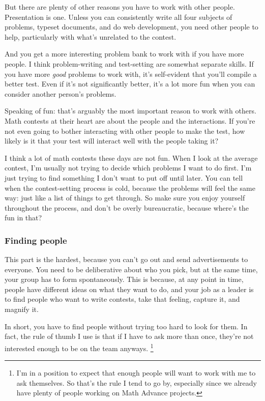 \documentclass[points=false]{bounce}
\begin{document}
But there are plenty of other reasons you have to work with other people.
Presentation is one. Unless you can consistently write all four subjects of problems,
typeset documents, and do web development, you need other people to help, particularly with
what's unrelated to the contest.

And you get a more interesting problem bank to work with if you have more people.
I think problem-writing and test-setting are somewhat separate skills.
If you have more \emph{good} problems to work with, it's self-evident
that you'll compile a better test. Even if it's not significantly better,
it's a lot more fun when you can consider another person's problems.

Speaking of fun: that's arguably the most important reason to work with others.
Math contests at their heart are about the people and the interactions.
If you're not even going to bother interacting with other people to make the test,
how likely is it that your test will interact well with the people taking it?

I think a lot of math contests these days are not fun.
When I look at the average contest,
I'm usually not trying to decide which problems I want to do first.
I'm just trying to find something I don't want to put off until later.
You can tell when the contest-setting process is cold,
because the problems will feel the same way:
just like a list of things to get through.
So make sure you enjoy yourself throughout the process,
and don't be overly bureaucratic, because where's the fun in that?

\subsubsection{Finding people}

This part is the hardest, because you can't go out and send advertisements to everyone.
You need to be deliberative about who you pick, but at the same time,
your group has to form spontaneously.
This is because, at any point in time, people have different ideas on what they want to do,
and your job as a leader is to find people who want to write contests,
take that feeling, capture it, and magnify it.

In short, you have to find people without
trying too hard to look for them.
In fact, the rule of thumb I use
is that if I have to ask more than once,
they're not interested enough to be on the team anyways.
\footnote{I'm in a position to expect that enough people
will want to work with me to ask themselves.
So that's the rule I tend to go by,
especially since we already have plenty of people
working on Math Advance projects.}
\end{document}
